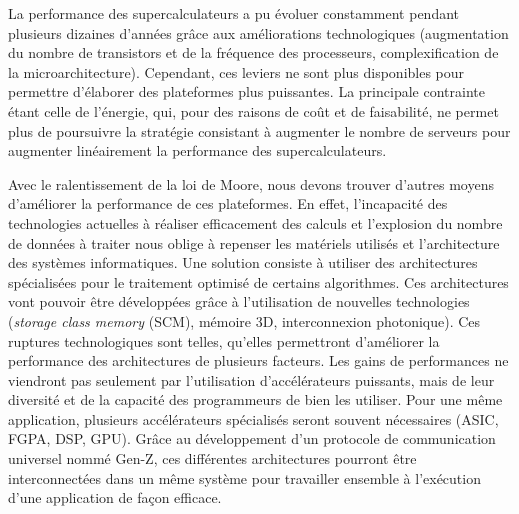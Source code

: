     
        
        La performance des supercalculateurs a pu évoluer constamment pendant plusieurs dizaines d'années grâce aux améliorations technologiques (augmentation du nombre de transistors et de la fréquence des processeurs, complexification de la microarchitecture). Cependant, ces leviers ne sont plus disponibles pour permettre d'élaborer des plateformes plus puissantes. La principale contrainte étant celle de l'énergie, qui, pour des raisons de coût et de faisabilité, ne permet plus de poursuivre la stratégie consistant à augmenter le nombre de serveurs pour augmenter linéairement la performance des supercalculateurs. 

        Avec le ralentissement de la loi de Moore, nous devons trouver d'autres moyens d'améliorer la performance de ces plateformes. En effet, l’incapacité des technologies actuelles à réaliser efficacement des calculs et l’explosion du nombre de données à traiter nous oblige à repenser les matériels utilisés et l’architecture des systèmes informatiques. Une solution consiste à utiliser des architectures spécialisées pour le traitement optimisé de certains algorithmes.  Ces architectures vont pouvoir être développées grâce à l'utilisation de nouvelles technologies (\textit{storage class memory} (SCM), mémoire 3D, interconnexion photonique). Ces ruptures technologiques sont telles, qu'elles permettront d'améliorer la performance des architectures de plusieurs facteurs. Les gains de performances ne viendront pas seulement par l'utilisation d'accélérateurs puissants, mais de leur diversité et de la capacité des programmeurs de bien les utiliser. Pour une même application, plusieurs accélérateurs spécialisés seront souvent nécessaires (ASIC, FGPA, DSP, GPU). Grâce au développement d'un protocole de communication universel nommé Gen-Z, ces différentes architectures pourront être interconnectées dans un même système pour travailler ensemble à l'exécution d'une application de façon efficace.
        
